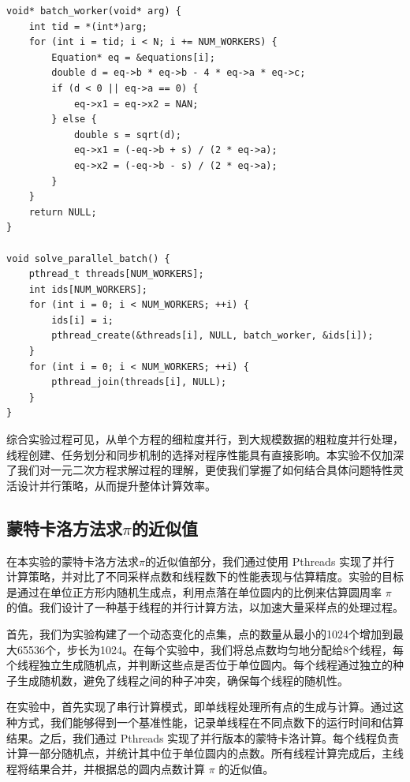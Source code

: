 \documentclass[a4paper, utf8]{ctexart}
\begin{document}
	\begin{verbatim}
void* batch_worker(void* arg) {
    int tid = *(int*)arg;
    for (int i = tid; i < N; i += NUM_WORKERS) {
        Equation* eq = &equations[i];
        double d = eq->b * eq->b - 4 * eq->a * eq->c;
        if (d < 0 || eq->a == 0) {
            eq->x1 = eq->x2 = NAN;
        } else {
            double s = sqrt(d);
            eq->x1 = (-eq->b + s) / (2 * eq->a);
            eq->x2 = (-eq->b - s) / (2 * eq->a);
        }
    }
    return NULL;
}

void solve_parallel_batch() {
    pthread_t threads[NUM_WORKERS];
    int ids[NUM_WORKERS];
    for (int i = 0; i < NUM_WORKERS; ++i) {
        ids[i] = i;
        pthread_create(&threads[i], NULL, batch_worker, &ids[i]);
    }
    for (int i = 0; i < NUM_WORKERS; ++i) {
        pthread_join(threads[i], NULL);
    }
}
	\end{verbatim}
	
	综合实验过程可见，从单个方程的细粒度并行，到大规模数据的粗粒度并行处理，线程创建、任务划分和同步机制的选择对程序性能具有直接影响。本实验不仅加深了我们对一元二次方程求解过程的理解，更使我们掌握了如何结合具体问题特性灵活设计并行策略，从而提升整体计算效率。
	
	\subsection{蒙特卡洛方法求$\pi$的近似值}
	
	在本实验的蒙特卡洛方法求$\pi$的近似值部分，我们通过使用 Pthreads 实现了并行计算策略，并对比了不同采样点数和线程数下的性能表现与估算精度。实验的目标是通过在单位正方形内随机生成点，利用点落在单位圆内的比例来估算圆周率 $\pi$ 的值。我们设计了一种基于线程的并行计算方法，以加速大量采样点的处理过程。
	
	首先，我们为实验构建了一个动态变化的点集，点的数量从最小的1024个增加到最大65536个，步长为1024。在每个实验中，我们将总点数均匀地分配给8个线程，每个线程独立生成随机点，并判断这些点是否位于单位圆内。每个线程通过独立的种子生成随机数，避免了线程之间的种子冲突，确保每个线程的随机性。
	
	在实验中，首先实现了串行计算模式，即单线程处理所有点的生成与计算。通过这种方式，我们能够得到一个基准性能，记录单线程在不同点数下的运行时间和估算结果。之后，我们通过 Pthreads 实现了并行版本的蒙特卡洛计算。每个线程负责计算一部分随机点，并统计其中位于单位圆内的点数。所有线程计算完成后，主线程将结果合并，并根据总的圆内点数计算 $\pi$ 的近似值。
	
\end{document}
